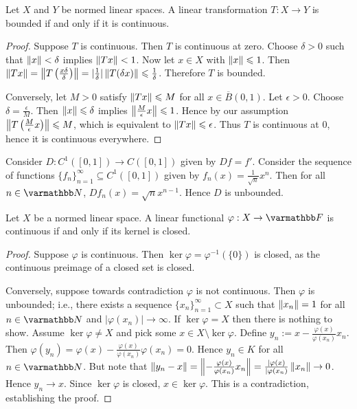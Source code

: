 \begin{theorem}
    Let $X$ and $Y$ be normed linear spaces. A linear transformation $T:X \rightarrow Y$ is bounded if and only if it is continuous.
\end{theorem}
    \begin{proof}
        Suppose $T$ is continuous. Then $T$ is continuous at zero. Choose $\delta > 0$ such that $\left\lVert x  \right\rVert < \delta$ implies $\left\lVert Tx  \right\rVert < 1$. Now let $x \in X$ with $\left\lVert x \right\rVert \leqslant 1$. Then $\left\lVert Tx \right\rVert = \left\lVert T \left( \frac{x \delta}{\delta} \right) \right\rVert = |\frac{1}{\delta}| \left\lVert T(\delta x) \right\rVert \leqslant \frac{1}{\delta}$. Therefore $T$ is bounded.

        Conversely, let $M > 0$ satisfy $\left\lVert Tx \right\rVert \leqslant M$ for all $x \in \overline{B}(0,1)$. Let $\epsilon > 0$. Choose $\delta = \frac{\epsilon}{M}$. Then $\left\lVert x \right\rVert \leqslant \delta$ implies $\left\lVert \frac{M}{\epsilon}x \right\rVert \leqslant 1$. Hence by our assumption $\left\lVert T \left( \frac{M}{\epsilon}x \right) \right\rVert \leqslant M$, which is equivalent to $\left\lVert Tx \right\rVert \leqslant \epsilon$. Thus $T$ is continuous at 0, hence it is continuous everywhere.
    \end{proof}

\begin{example}\label{example:unbounded-operator}
    Consider $D:C^1([0,1]) \rightarrow C([0,1])$ given by $Df = f'$. Consider the sequence of functions $\{f_n\}_{n = 1}^\infty \subseteq C^1([0,1])$ given by $f_n(x) = \frac{1}{\sqrt{n}}x^n$. Then for all $n \in \bfN$, $Df_n(x) =\sqrt{n}x^{n-1}$. Hence $D$ is unbounded.
\end{example}

\begin{theorem}\label{thm:lin-funct-cont-iff-kern-closed}
    Let $X$ be a normed linear space. A linear functional $\varphi:X \rightarrow \bfF$ is continuous if and only if its kernel is closed.
\end{theorem}
    \begin{proof}
        Suppose $\varphi$ is continuous. Then $\ker \varphi = \varphi^{-1}(\{0\})$ is closed, as the continuous preimage of a closed set is closed.

        Conversely, suppose towards contradiction $\varphi$ is not continuous. Then $\varphi$ is unbounded; i.e., there exists a sequence $\{x_n\}_{n = 1}^\infty \subset X$ such that $\left\lVert x_n \right\rVert = 1$ for all $n \in \bfN$ and $|\varphi(x_n)| \rightarrow \infty$. If $\ker\varphi = X$ then there is nothing to show. Assume $\ker\varphi \neq X$ and pick some $x \in X \setminus \ker\varphi$. Define $y_n := x - \frac{\varphi(x)}{\varphi(x_n)}x_n$. Then $\varphi(y_n) = \varphi(x) - \frac{\varphi(x)}{\varphi(x_n)}\varphi(x_n) = 0$. Hence $y_n \in K$ for all $n \in \bfN$. But note that $\left\lVert y_n - x \right\rVert = \left\lVert - \frac{\varphi(x)}{\varphi(x_n)}x_n \right\rVert = \frac{|\varphi(x)}{|\varphi(x_n)}\left\lVert x_n \right\rVert \rightarrow 0$. Hence $y_n \rightarrow x$. Since $\ker\varphi$ is closed, $x \in \ker\varphi$. This is a contradiction, establishing the proof.
    \end{proof}

